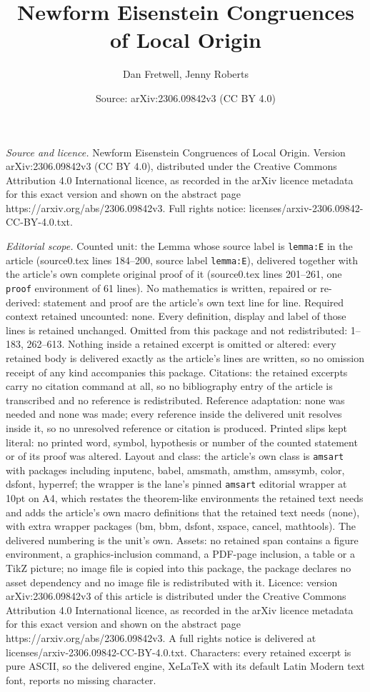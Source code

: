 \documentclass[10pt,a4paper]{amsart}
\title[Newform Eisenstein Congruences of Local Origin]{Newform Eisenstein Congruences of Local Origin}
\author{Dan Fretwell, Jenny Roberts}
\date{Source: arXiv:2306.09842v3 (CC BY 4.0)}
\begin{document}
\maketitle

\noindent\emph{Source and licence.} Newform Eisenstein Congruences of Local Origin. Version arXiv:2306.09842v3 (CC BY 4.0), distributed under the Creative Commons Attribution 4.0 International licence, as recorded in the arXiv licence metadata for this exact version and shown on the abstract page https://arxiv.org/abs/2306.09842v3. Full rights notice: licenses/arxiv-2306.09842-CC-BY-4.0.txt.\par\smallskip

\noindent\textit{Editorial scope.} Counted unit: the Lemma whose source label is \texttt{lemma:E} in the article (source0.tex lines 184--200, source label \texttt{lemma:E}), delivered together with the article's own complete original proof of it (source0.tex lines 201--261, one \texttt{proof} environment of 61 lines). No mathematics is written, repaired or re-derived: statement and proof are the article's own text line for line. Required context retained uncounted: none. Every definition, display and label of those lines is retained unchanged. Omitted from this package and not redistributed: 1--183, 262--613. Nothing inside a retained excerpt is omitted or altered: every retained body is delivered exactly as the article's lines are written, so no omission receipt of any kind accompanies this package. Citations: the retained excerpts carry no citation command at all, so no bibliography entry of the article is transcribed and no reference is redistributed. Reference adaptation: none was needed and none was made; every reference inside the delivered unit resolves inside it, so no unresolved reference or citation is produced. Printed slips kept literal: no printed word, symbol, hypothesis or number of the counted statement or of its proof was altered. Layout and class: the article's own class is \texttt{amsart} with packages including inputenc, babel, amsmath, amsthm, amssymb, color, dsfont, hyperref; the wrapper is the lane's pinned \texttt{amsart} editorial wrapper at 10pt on A4, which restates the theorem-like environments the retained text needs and adds the article's own macro definitions that the retained text needs (none), with extra wrapper packages (bm, bbm, dsfont, xspace, cancel, mathtools). The delivered numbering is the unit's own. Assets: no retained span contains a figure environment, a graphics-inclusion command, a PDF-page inclusion, a table or a TikZ picture; no image file is copied into this package, the package declares no asset dependency and no image file is redistributed with it. Licence: version arXiv:2306.09842v3 of this article is distributed under the Creative Commons Attribution 4.0 International licence, as recorded in the arXiv licence metadata for this exact version and shown on the abstract page https://arxiv.org/abs/2306.09842v3. A full rights notice is delivered at licenses/arxiv-2306.09842-CC-BY-4.0.txt. Characters: every retained excerpt is pure ASCII, so the delivered engine, XeLaTeX with its default Latin Modern text font, reports no missing character.
\end{document}
